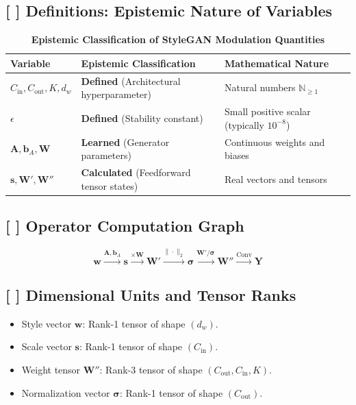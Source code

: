 \documentclass[11pt,a4paper]{article}
\theoremstyle{definition}
\begin{document}
\subsection{[ ] Definitions: Epistemic Nature of Variables}
\begin{table}[h]
\centering
\caption{\textbf{Epistemic Classification of StyleGAN Modulation Quantities}}
\begin{tabular}{lll}
\toprule
\textbf{Variable} & \textbf{Epistemic Classification} & \textbf{Mathematical Nature} \\
\midrule
$C_{\text{in}}, C_{\text{out}}, K, d_w$ & \textbf{Defined} (Architectural hyperparameter) & Natural numbers $\mathbb{N}_{\ge 1}$ \\
$\epsilon$ & \textbf{Defined} (Stability constant) & Small positive scalar (typically $10^{-8}$) \\
$\mathbf{A}, \mathbf{b}_A, \mathbf{W}$ & \textbf{Learned} (Generator parameters) & Continuous weights and biases \\
$\mathbf{s}, \mathbf{W}', \mathbf{W}''$ & \textbf{Calculated} (Feedforward tensor states) & Real vectors and tensors \\
\bottomrule
\end{tabular}
\end{table}

\subsection{[ ] Operator Computation Graph}
{\boldmath
\begin{equation}
\mathbf{w} \xrightarrow{\mathbf{A}, \mathbf{b}_A} \mathbf{s} \xrightarrow{\times \mathbf{W}} \mathbf{W}' \xrightarrow{\|\cdot\|_2} \boldsymbol{\sigma} \xrightarrow{\mathbf{W}' / \boldsymbol{\sigma}} \mathbf{W}'' \xrightarrow{\text{Conv}} \mathbf{Y}
\end{equation}
}

\subsection{[ ] Dimensional Units and Tensor Ranks}
\begin{itemize}
    \item Style vector $\mathbf{w}$: Rank-1 tensor of shape $(d_w)$.
    \item Scale vector $\mathbf{s}$: Rank-1 tensor of shape $(C_{\text{in}})$.
    \item Weight tensor $\mathbf{W}''$: Rank-3 tensor of shape $(C_{\text{out}}, C_{\text{in}}, K)$.
    \item Normalization vector $\boldsymbol{\sigma}$: Rank-1 tensor of shape $(C_{\text{out}})$.
\end{itemize}
\end{document}

